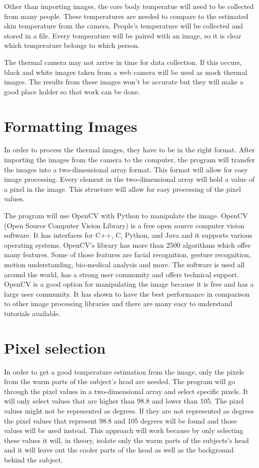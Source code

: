 ﻿\documentclass[onecolumn, draftclsnofoot,10pt, compsoc]{IEEEtran}
\begin{document}
Other than importing images, the core body temperatue will need to be collected from many people. These temperatures are needed to compare to the estimated skin temperature from the camera. People’s temperature will be collected and stored in a file. Every temperature will be paired with an image, so it is clear which temperature belongs to which person. 

The thermal camera may not arrive in time for data collection. If this occurs, black and white images taken from a web camera will be used as mock thermal images. The results from these images won't be accurate but they will make a good place holder so that work can be done. 


\section{Formatting Images}

In order to process the thermal images, they have to be in the right format. After importing the images from the camera to the computer, the program will transfer the images into a two-dimensional array format. This format will allow for easy image processing. Every element in the two-dimensional array will hold a value of a pixel in the image. This structure will allow for easy processing of the pixel values. 

The program will use OpenCV with Python to manipulate the image. OpenCV (Open Source Computer Vision Library) is a free open source computer vision software. It has interfaces for C++, C, Python, and Java and it supports various operating systems. OpenCV’s library has more than 2500 algorithms which offer many features. Some of those features are facial recognition, gesture recognition, motion understanding, bio-medical analysis and more. The software is used all around the world, has a strong user community and offers technical support. OpenCV is a good option for manipulating the image because it is free and has a large user community. It has shown to have the best performance in comparison to other image processing libraries and there are many easy to understand tutorials available.\cite{ClaudeTech}

\section{Pixel selection}
In order to get a good temperature estimation from the image, only the pixels from the warm parts of the subject's head are needed. The program will go through the pixel values in a two-dimensional array and select specific pixels. It will only select values that are higher than 98.8 and lower than 105. The pixel values might not be represented as degrees. If they are not represented as degrees the pixel values that represent 98.8 and 105 degrees will be found and those values will be used instead. This approach will work because by only selecting these values it will,  in theory, isolate only the warm parts of the subjects’s head and it will leave out the cooler parts of the head as well as the background behind the subject. 
\end{document}
